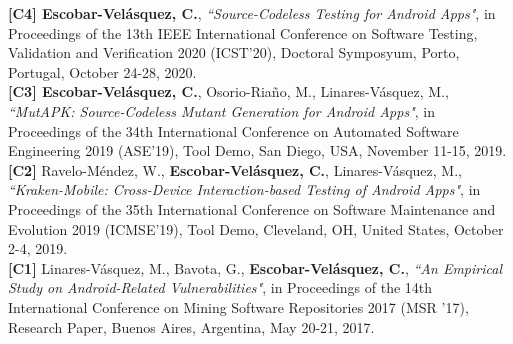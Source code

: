 \documentclass[letterpaper,11pt,oneside]{article}
\begin{document}
\noindent \textbf{[C4] Escobar-Velásquez, C.}, \textit{``Source-Codeless Testing for Android Apps"}, in Proceedings of the 13th IEEE International Conference on Software Testing, Validation and Verification 2020 (ICST’20), Doctoral Symposyum, Porto, Portugal, October 24-28, 2020. \\
\noindent \textbf{[C3] Escobar-Velásquez, C.}, Osorio-Riaño, M., Linares-Vásquez, M., \textit{``MutAPK: Source-Codeless Mutant Generation for Android Apps"}, in Proceedings of the 34th International Conference on Automated Software Engineering 2019 (ASE’19), Tool Demo, San Diego, USA, November 11-15, 2019. \\
\noindent \textbf{[C2]} Ravelo-Méndez, W., \textbf{Escobar-Velásquez, C.}, Linares-Vásquez, M., \textit{``Kraken-Mobile: Cross-Device Interaction-based Testing of Android Apps"}, in Proceedings of the 35th International Conference on Software Maintenance and Evolution 2019 (ICMSE’19), Tool Demo, Cleveland, OH, United States, October 2-4, 2019. \\
\noindent \textbf{[C1]} Linares-Vásquez, M., Bavota, G., \textbf{Escobar-Velásquez, C.}, \textit{``An Empirical Study on Android-Related Vulnerabilities"}, in Proceedings of the 14th International Conference on Mining Software Repositories 2017 (MSR ’17), Research Paper, Buenos Aires, Argentina, May 20-21, 2017. \\
\end{document}
